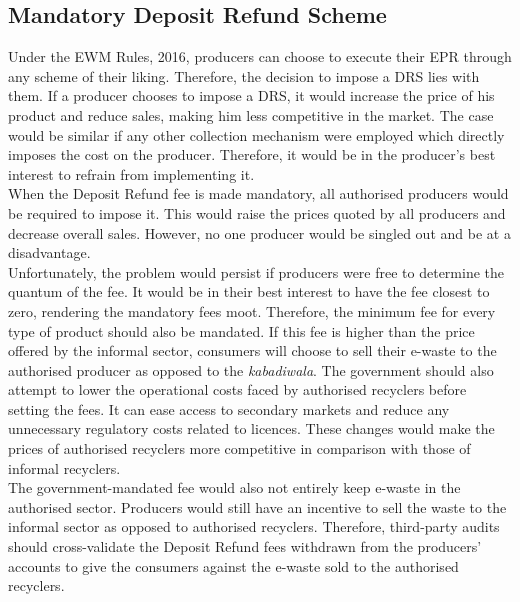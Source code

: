 \documentclass[a4paper, 12pt]{article}
\begin{document}
                    \subsection{Mandatory Deposit Refund Scheme}
                    
                    Under the EWM Rules, 2016, producers can choose to execute their EPR through any scheme of their liking. Therefore, the decision to impose a DRS lies with them. If a producer chooses to impose a DRS, it would increase the price of his product and reduce sales, making him less competitive in the market. The case would be similar if any other collection mechanism were employed which directly imposes the cost on the producer. Therefore, it would be in the producer’s best interest to refrain from implementing it. \\
                    
                    When the Deposit Refund fee is made mandatory, all authorised producers would be required to impose it. This would raise the prices quoted by all producers and decrease overall sales. However, no one producer would be singled out and be at a disadvantage.\\
                      
                      Unfortunately, the problem would persist if producers were free to determine the quantum of the fee. It would be in their best interest to have the fee closest to zero, rendering the mandatory fees moot. Therefore, the minimum fee for every type of product should also be mandated. If this fee is higher than the price offered by the informal sector, consumers will choose to sell their e-waste to the authorised producer as opposed to the \textit{kabadiwala}. The government should also attempt to lower the operational costs faced by authorised recyclers before setting the fees. It can ease access to secondary markets and reduce any unnecessary regulatory costs related to licences. These changes would make the prices of authorised recyclers more competitive in comparison with those of informal recyclers.\\
                    
                    The government-mandated fee would also not entirely keep e-waste in the authorised sector. Producers would still have an incentive to sell the waste to the informal sector as opposed to authorised recyclers. Therefore, third-party audits should cross-validate the Deposit Refund fees withdrawn from the producers’ accounts to give the consumers against the e-waste sold to the authorised recyclers.\\ 
                    
\end{document}
